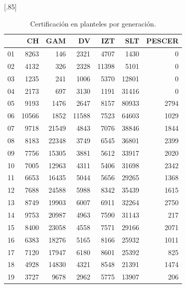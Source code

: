 \documentclass[12pt]{article}
\begin{document}
\begin{table}[ht]
\centering
\scalebox{0.75}[.85]{
\begin{tabular}{rrrrrrr}
  \hline
 & CH & GAM & DV & IZT & SLT & PESCER \\ 
  \hline
01 & 8263 & 146 & 2321 & 4707 & 1430 &   0 \\ 
  02 & 4132 & 326 & 2328 & 11398 & 5101 &   0 \\ 
  03 & 1235 & 241 & 1006 & 5370 & 12801 &   0 \\ 
  04 & 2173 & 697 & 3130 & 1191 & 31416 &   0 \\ 
  05 & 9193 & 1476 & 2647 & 8157 & 80933 & 2794 \\ 
  06 & 10566 & 1852 & 11588 & 7523 & 64603 & 1029 \\ 
  07 & 9718 & 21549 & 4843 & 7076 & 38846 & 1844 \\ 
  08 & 8183 & 22348 & 3749 & 6545 & 36801 & 2399 \\ 
  09 & 7756 & 15305 & 3881 & 5612 & 33917 & 2020 \\ 
  10 & 7005 & 12963 & 4311 & 5406 & 31698 & 2342 \\ 
  11 & 6653 & 16435 & 5044 & 5656 & 29265 & 1368 \\ 
  12 & 7688 & 24588 & 5988 & 8342 & 35439 & 1615 \\ 
  13 & 8749 & 19903 & 6007 & 6911 & 32264 & 2750 \\ 
  14 & 9753 & 20987 & 4963 & 7590 & 31143 & 217 \\ 
  15 & 8400 & 23058 & 4558 & 7571 & 29166 & 2071 \\ 
  16 & 6383 & 18276 & 5165 & 8166 & 25932 & 1011 \\ 
  17 & 7120 & 17947 & 6180 & 8601 & 25392 & 825 \\ 
  18 & 4928 & 14830 & 4321 & 8548 & 21391 & 1474 \\ 
  19 & 3727 & 9678 & 2962 & 5775 & 13907 & 206 \\ 
   \hline
\end{tabular}}
\caption{\label{Cert_Gen_Plantel}Certificaci\'on en planteles por generaci\'on.}
\end{table}
\end{document}
